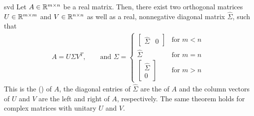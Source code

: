 \begin{Theorem}{svd}
  Let $A\in\mathbb R^{m\times n}$ be a real matrix. Then, there exist two
  orthogonal matrices $U\in\mathbb R^{m\times m}$ and $V\in \mathbb R^{n\times n}$
  as well as a real, nonnegative diagonal matrix $\hat\Sigma$, such
  that
  \begin{gather}
    \label{eq:svd:1}
    A = U \Sigma V^T,
    \qquad\text{and }
    \Sigma =
    \begin{cases}
      \begin{bmatrix}
        \hat\Sigma &0
      \end{bmatrix}
      &\text{for } m<n\\
      \hat\Sigma&\text{for } m=n\\
      \begin{bmatrix}
        \hat\Sigma \\0
      \end{bmatrix}
      &\text{for } m>n
    \end{cases}
  \end{gather}
  This is the  () of
  $A$, the diagonal entries of $\hat \Sigma$ are the
   of $A$ and the column vectors of $U$ and
  $V$ are the left and right  of $A$,
  respectively. The same theorem holds for complex matrices with
  unitary $U$ and $V$.
\end{Theorem}


